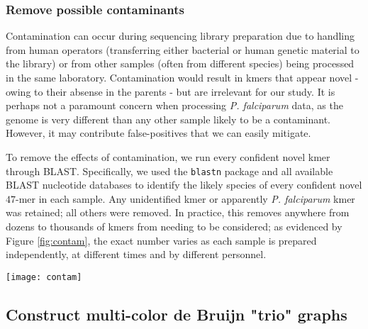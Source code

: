 \subsubsection{Remove possible contaminants}

Contamination can occur during sequencing library preparation due to handling from human operators (transferring either bacterial or human genetic material to the library) or from other samples (often from different species) being processed in the same laboratory.  Contamination would result in kmers that appear novel - owing to their absense in the parents - but are irrelevant for our study.  It is perhaps not a paramount concern when processing \textit{P. falciparum} data, as the genome is very different than any other sample likely to be a contaminant.  However, it may contribute false-positives that we can easily mitigate.

To remove the effects of contamination, we run every confident novel kmer through BLAST\cite{Altschul:1990dw}.  Specifically, we used the \texttt{blastn} package and all available BLAST nucleotide databases to identify the likely species of every confident novel $47$-mer in each sample.  Any unidentified kmer or apparently \textit{P. falciparum} kmer was retained; all others were removed.  In practice, this removes anywhere from dozens to thousands of kmers from needing to be considered; as evidenced by Figure \ref{fig:contam}, the exact number varies as each sample is prepared independently, at different times and by different personnel.

\begin{sidewaysfigure}[p]
  \centering
    \texttt{[image: contam]}
  \caption{Removal of contaminating kmers; \textit{P. falciparum} kmers are shown in green; the putative contaminants are shown in orange.}
  \label{fig:contam}
\end{sidewaysfigure}

\subsection{Construct multi-color de Bruijn "trio" graphs}


